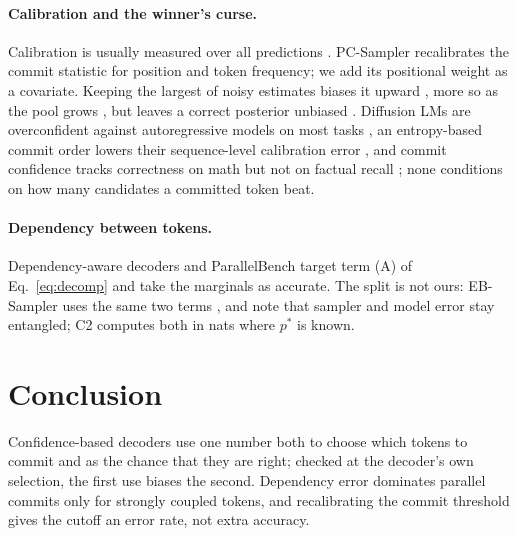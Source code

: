 \paragraph{Calibration and the winner's curse.}
Calibration is usually measured over all predictions \citep{guo2017calibration}. PC-Sampler
\citep{huang2025pcsampler} recalibrates the commit statistic for position and token frequency; we add its positional
weight as a covariate. Keeping the largest of noisy estimates biases it upward
\citep{andrews2024winners}, more so as the pool grows \citep{dalal2026beam}, but leaves a correct
posterior unbiased \citep{dawid1994selection,efron2011tweedie}. Diffusion LMs are overconfident
against autoregressive models on most tasks \citep{yadav2026bidirectional}, an entropy-based
commit order lowers their sequence-level calibration error \citep{jiang2026bayeser}, and commit
confidence tracks correctness on math but not on factual recall
\citep{asaria2026diffusiongemma}; none conditions on how many candidates a committed token beat.

\paragraph{Dependency between tokens.}
Dependency-aware decoders \citep{kim2026dapd,ringel2026demask,azangulov2026punt} and
ParallelBench \citep{kang2026parallelbench} target term (A) of Eq.~\ref{eq:decomp} and take
the marginals as accurate. The split is not ours: EB-Sampler uses the same two terms
\citep{benhamu2025entropy}, and \citet{tang2026sampler} note that sampler and model error stay
entangled; C2 computes both in nats where $p^*$ is known.

\section{Conclusion}

Confidence-based decoders use one number both to choose which tokens to commit and as the chance that they are right; checked at the decoder's own selection, the first use biases the second. Dependency error dominates parallel commits only for strongly coupled tokens, and recalibrating the commit threshold gives the cutoff an error rate, not extra accuracy.







